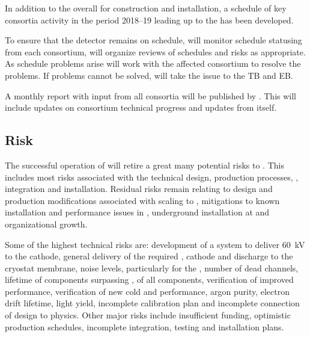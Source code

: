 In addition to the overall  for construction and
installation, a schedule of key consortia activity in the period
2018--19 leading up to the  has been developed.

To ensure that the  detector remains on schedule,
 will monitor schedule statusing from each consortium, will organize
reviews of schedules and risks as appropriate.  As schedule problems
arise  will work with the affected consortium to resolve the
problems. If problems cannot be solved,  will take the issue to the
TB and EB.

A monthly report with input from all consortia will be published by
. This will include updates on consortium technical progress and
updates from  itself.


\subsection{Risk}
\label{sec:fdsp-coord-risk}

The successful operation of  will retire a great many
potential risks to . This includes most risks associated with the
technical design, production processes, , integration
and installation. Residual risks remain relating to design and
production modifications associated with scaling to , mitigations
to known installation and performance issues in , underground
installation at \surf and organizational growth.

Some of the highest technical risks are: development of a system to
deliver \SI{60}{kV} to the \dual cathode, general delivery of the
required , cathode and  discharge to the cryostat
membrane, noise levels, particularly for the , %
number of dead channels, lifetime of components surpassing \dunelifetime{}, %
 of all components, verification of improved 
performance, verification of new cold   and   performance,
argon purity, electron drift lifetime, \phel light yield,
incomplete calibration plan and incomplete connection of design to
physics. Other major risks include insufficient funding, optimistic
production schedules, incomplete integration, testing and installation
plans.

